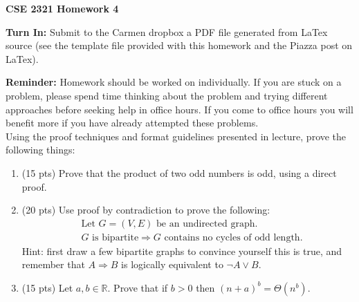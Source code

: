\documentclass[14pt]{extarticle}
\begin{document}
\textbf{CSE 2321 Homework 4}

\textbf{Turn In:} Submit to the Carmen dropbox a PDF file generated from LaTex source (see the template file provided with this homework and the Piazza post on LaTex).

\textbf{Reminder:} Homework should be worked on individually. If you are stuck on a problem, please spend time thinking about the problem and trying different approaches before seeking help in office hours. If you come to office hours you will benefit more if you have already attempted these problems. \\

Using the proof techniques and format guidelines presented in lecture, prove the following things:
\begin{enumerate}

\item (15 pts) Prove that the product of two odd numbers is odd, using a direct proof.

\item (20 pts) Use proof by contradiction to prove the following:
\begin{align*}
&\mbox{Let $G =(V, E)$ be an undirected graph.}\\
&\mbox{$G$ is bipartite} \Rightarrow \mbox{$G$ contains no cycles of odd length}.
\end{align*}
Hint: first draw a few bipartite graphs to convince yourself this is true, and remember that $A \Rightarrow B$ is logically equivalent to $\neg A \lor B$.

\item (15 pts) Let $a, b \in \mathbb{R}$. Prove that if $b>0$ then $(n+a)^b = \Theta(n^b)$.

\end{enumerate}
\end{document}
